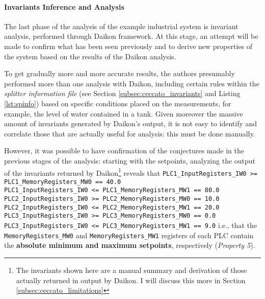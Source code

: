 \paragraph{Invariants Inference and Analysis}
The last phase of the analysis of the example industrial system is invariant analysis, performed through Daikon framework. At this stage, an attempt will be made to confirm what has been seen previously and to derive new properties of the system based on the results of the Daikon analysis.

\bigskip
To get gradually more and more accurate results, the authors presumably performed more than one analysis with Daikon, including certain rules within the \textit{splitter information file} (see Section \ref{subsec:ceccato_invariants} and Listing \ref{lst:spinfo}) based on specific conditions placed on the measurements, for example, the level of water contained in a tank. Given moreover the massive amount of invariants generated by Daikon's output, it is not easy to identify and correlate those that are actually useful for analysis: this must be done manually.

\bigskip
However, it was possible to have confirmation of the conjectures made in the previous stages of the analysis: starting with the setpoints, analyzing the output of the invariants returned by Daikon\footnote{The invariants shown here are a manual summary and derivation of those actually returned in output by Daikon. I will discuss this more in Section \ref{subsec:ceccato_limitations}} reveals that \newline \newline
\small\texttt{PLC1\_InputRegisters\_IW0 >= PLC1\_MemoryRegisters\_MW0 == 40.0}\\
\texttt{PLC1\_InputRegisters\_IW0 <= PLC1\_MemoryRegisters\_MW1 == 80.0}\\
\texttt{PLC2\_InputRegisters\_IW0 >= PLC2\_MemoryRegisters\_MW0 == 10.0}\\
\texttt{PLC2\_InputRegisters\_IW0 <= PLC2\_MemoryRegisters\_MW1 == 20.0}\\
\texttt{PLC3\_InputRegisters\_IW0 >= PLC3\_MemoryRegisters\_MW0 == 0.0}\\
\texttt{PLC3\_InputRegisters\_IW0 <= PLC3\_MemoryRegisters\_MW1 == 9.0} \newline \newline
\normalsize i.e., that the \texttt{MemoryRegisters\_MW0} and \texttt{MemoryRegisters\_MW1} registers of each PLC contain the \textbf{absolute minimum and maximum setpoints}, respectively (\textit{Property 5}).


